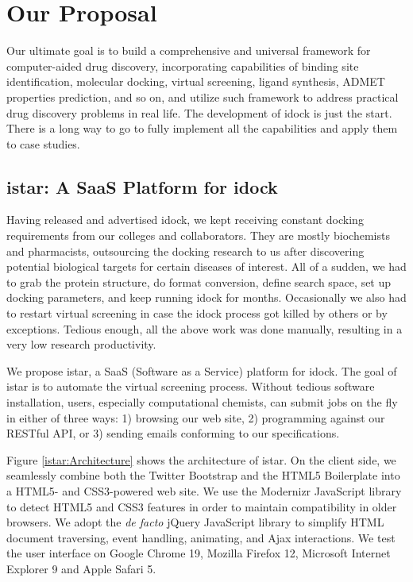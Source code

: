 \chapter{Our Proposal}

Our ultimate goal is to build a comprehensive and universal framework for computer-aided drug discovery, incorporating capabilities of binding site identification, molecular docking, virtual screening, ligand synthesis, ADMET properties prediction, and so on, and utilize such framework to address practical drug discovery problems in real life. The development of idock is just the start. There is a long way to go to fully implement all the capabilities and apply them to case studies.

\section{istar: A SaaS Platform for idock}

Having released and advertised idock, we kept receiving constant docking requirements from our colleges and collaborators. They are mostly biochemists and pharmacists, outsourcing the docking research to us after discovering potential biological targets for certain diseases of interest. All of a sudden, we had to grab the protein structure, do format conversion, define search space, set up docking parameters, and keep running idock for months. Occasionally we also had to restart virtual screening in case the idock process got killed by others or by exceptions. Tedious enough, all the above work was done manually, resulting in a very low research productivity.

We propose istar, a SaaS (Software as a Service) platform for idock. The goal of istar is to automate the virtual screening process. Without tedious software installation, users, especially computational chemists, can submit jobs on the fly in either of three ways: 1) browsing our web site, 2) programming against our RESTful API, or 3) sending emails conforming to our specifications.

Figure \ref{istar:Architecture} shows the architecture of istar. On the client side, we seamlessly combine both the Twitter Bootstrap and the HTML5 Boilerplate into a HTML5- and CSS3-powered web site. We use the Modernizr JavaScript library to detect HTML5 and CSS3 features in order to maintain compatibility in older browsers. We adopt the \textit{de facto} jQuery JavaScript library to simplify HTML document traversing, event handling, animating, and Ajax interactions. We test the user interface on Google Chrome 19, Mozilla Firefox 12, Microsoft Internet Explorer 9 and Apple Safari 5.

